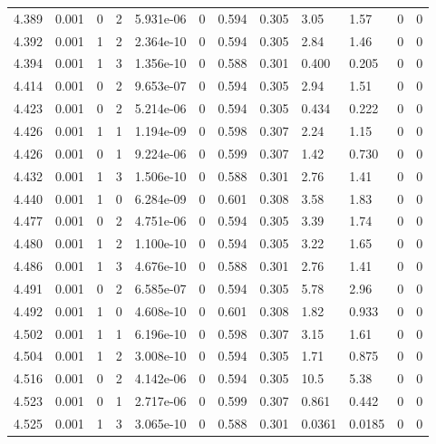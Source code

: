 \documentclass[preview]{standalone}
\begin{document}
{{{{{{{{{{\begin{tabular}{L{1.2cm}C{1.2cm} C{0.3cm}C{0.5cm} C{1.4cm}C{1.4cm} C{1.4cm}C{1.4cm} C{1.6cm}C{1.6cm} C{1.6cm}C{1.6cm}}
  4.389  &  0.001  & 0     &  2 &  5.931e-06  & 0  &  0.594&   0.305& 3.05 & 1.57   &  0 & 0  \\ 
  4.392  &  0.001  & 1     &  2 &  2.364e-10  & 0  &  0.594&   0.305& 2.84 & 1.46   &  0 & 0  \\ 
  4.394  &  0.001  & 1     &  3 &  1.356e-10  & 0  &  0.588&   0.301& 0.400 & 0.205   &  0 & 0  \\ 
  4.414  &  0.001  & 0     &  2 &  9.653e-07  & 0  &  0.594&   0.305& 2.94 & 1.51   &  0 & 0  \\ 
  4.423  &  0.001  & 0     &  2 &  5.214e-06  & 0  &  0.594&   0.305& 0.434 & 0.222   &  0 & 0  \\ 
  4.426  &  0.001  & 1     &  1 &  1.194e-09  & 0  &  0.598&   0.307& 2.24 & 1.15   &  0 & 0  \\ 
  4.426  &  0.001  & 0     &  1 &  9.224e-06  & 0  &  0.599&   0.307& 1.42 & 0.730   &  0 & 0  \\ 
  4.432  &  0.001  & 1     &  3 &  1.506e-10  & 0  &  0.588&   0.301& 2.76 & 1.41   &  0 & 0  \\ 
  4.440  &  0.001  & 1     &  0 &  6.284e-09  & 0  &  0.601&   0.308& 3.58 & 1.83   &  0 & 0  \\ 
  4.477  &  0.001  & 0     &  2 &  4.751e-06  & 0  &  0.594&   0.305& 3.39 & 1.74   &  0 & 0  \\ 
  4.480  &  0.001  & 1     &  2 &  1.100e-10  & 0  &  0.594&   0.305& 3.22 & 1.65   &  0 & 0  \\ 
  4.486  &  0.001  & 1     &  3 &  4.676e-10  & 0  &  0.588&   0.301& 2.76 & 1.41   &  0 & 0  \\ 
  4.491  &  0.001  & 0     &  2 &  6.585e-07  & 0  &  0.594&   0.305& 5.78 & 2.96   &  0 & 0  \\ 
  4.492  &  0.001  & 1     &  0 &  4.608e-10  & 0  &  0.601&   0.308& 1.82 & 0.933   &  0 & 0  \\ 
  4.502  &  0.001  & 1     &  1 &  6.196e-10  & 0  &  0.598&   0.307& 3.15 & 1.61   &  0 & 0  \\ 
  4.504  &  0.001  & 1     &  2 &  3.008e-10  & 0  &  0.594&   0.305& 1.71 & 0.875   &  0 & 0  \\ 
  4.516  &  0.001  & 0     &  2 &  4.142e-06  & 0  &  0.594&   0.305& 10.5 & 5.38   &  0 & 0  \\ 
  4.523  &  0.001  & 0     &  1 &  2.717e-06  & 0  &  0.599&   0.307& 0.861 & 0.442   &  0 & 0  \\ 
  4.525  &  0.001  & 1     &  3 &  3.065e-10  & 0  &  0.588&   0.301& 0.0361 & 0.0185   &  0 & 0  \\ 

\end{tabular}}}}}}}}}}}
\end{document}
